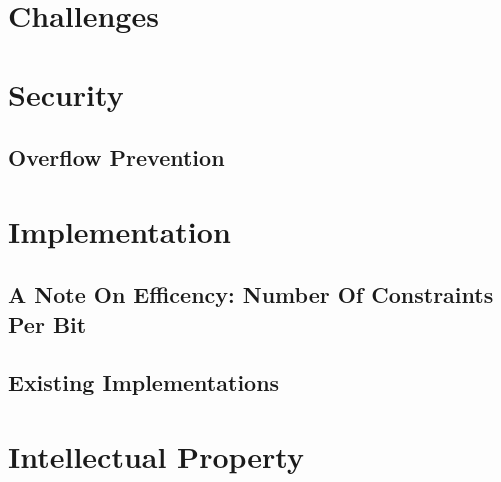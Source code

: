 \documentclass[11pt]{article}
\begin{document}
	\section{Challenges}
	

	\section{Security}
		\subsection{Overflow Prevention}
			

			
	\section{Implementation}
		\subsection{A Note On Efficency: Number Of Constraints Per Bit}
			
		\subsection{Existing Implementations}
			

	\section {Intellectual Property}
		

	
		

\end{document}
